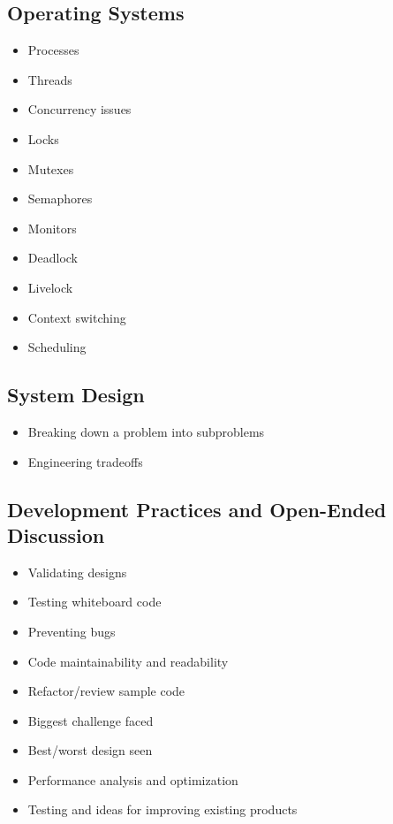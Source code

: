 \documentclass{article}
\begin{document}
\subsection{Operating Systems}
\begin{itemize}
    \item Processes
    \item Threads
    \item Concurrency issues
    \item Locks
    \item Mutexes
    \item Semaphores
    \item Monitors
    \item Deadlock
    \item Livelock
    \item Context switching
    \item Scheduling
\end{itemize}

\subsection{System Design}
\begin{itemize}
    \item Breaking down a problem into subproblems
    \item Engineering tradeoffs
\end{itemize}

\subsection{Development Practices and Open-Ended Discussion}
\begin{itemize}
    \item Validating designs
    \item Testing whiteboard code
    \item Preventing bugs
    \item Code maintainability and readability
    \item Refactor/review sample code
    \item Biggest challenge faced
    \item Best/worst design seen
    \item Performance analysis and optimization
    \item Testing and ideas for improving existing products
\end{itemize}
\end{document}
